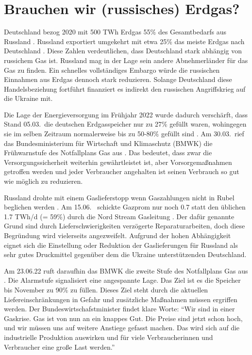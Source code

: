 
\section{Brauchen wir (russisches) Erdgas?}
\label{ch:Introduction}


Deutschland bezog 2020 mit 500 TWh Erdgas 55\% des Gesamtbedarfs aus Russland \cite{clausen2022}. Russland exportiert umgekehrt mit etwa 25\% das meiste Erdgas nach Deutschland \cite{iwd}. 
Diese Zahlen verdeutlichen, dass Deutschland stark abhängig von russichem Gas ist. Russland mag in der Lage sein andere Abnehmerländer für das Gas zu finden. Ein schnelles vollständiges Embargo würde die russischen Einnahmen aus Erdgas dennoch stark reduzieren. Solange Deutschland diese Handelsbeziehung fortführt finanziert es indirekt den russischen Angriffskrieg auf die Ukraine mit.

Die Lage der Energieversorgung im Frühjahr 2022 wurde dadurch verschärft, dass Stand 05.03.~die deutschen Erdgasspeicher nur zu 27\% gefüllt waren, wohingegen sie im selben Zeitraum normalerweise bis zu 50-80\% gefüllt sind \cite{leo}. Am 30.03.~rief das Bundesministerium für Wirtschaft und Klimaschutz (BMWK) die Frühwarnstufe des Notfallplans Gas aus \cite{bmwk}. Das bedeutet, dass zwar die Versorgungssicherheit weiterhin gewährtleistet ist, aber Vorsorgemaßnahmen getroffen werden und jeder Verbraucher angehalten ist seinen Verbrauch so gut wie möglich zu reduzieren.

Russland drohte mit einem Gaslieferstopp wenn Gaszahlungen nicht in Rubel beglichen werden \cite{bmwk}.
Am 15.06.~ schickte Gazprom nur noch 0.7 statt den üblichen 1.7 TWh/d (= 59\%) durch die Nord Stream Gasleitung \cite{gazprom-gasverknappung}. Der dafür genannte Grund sind durch Lieferschwierigkeiten verzögerte Reparaturarbeiten, doch diese Begründung wird vielerseits angezweifelt. Aufgrund der hohen Abhängigkeit eignet sich die Einstellung oder Reduktion der Gaslieferungen für Russland als sehr gutes Druckmittel gegenüber dem die Ukraine unterstützenden Deutschland. 

Am 23.06.22 ruft daraufhin das BMWK die zweite Stufe des Notfallplans Gas aus \cite{bmwk-2}. Die Alarmstufe signalisiert eine angespannte Lage. Das Ziel ist es die Speicher bis November zu 90\% zu füllen. Dieses Ziel steht durch die aktuellen Liefereinschränkungen in Gefahr und zusätzliche Maßnahmen müssen ergriffen werden. Der Bundeswirtschafstminister findet klare Worte: ``Wir sind in einer Gaskrise. Gas ist von nun an ein knappes Gut. Die Preise sind jetzt schon hoch, und wir müssen uns auf weitere Anstiege gefasst machen. Das wird sich auf die industrielle Produktion auswirken und für viele Verbraucherinnen und Verbraucher eine große Last werden.'' \cite{bmwk-2} 

